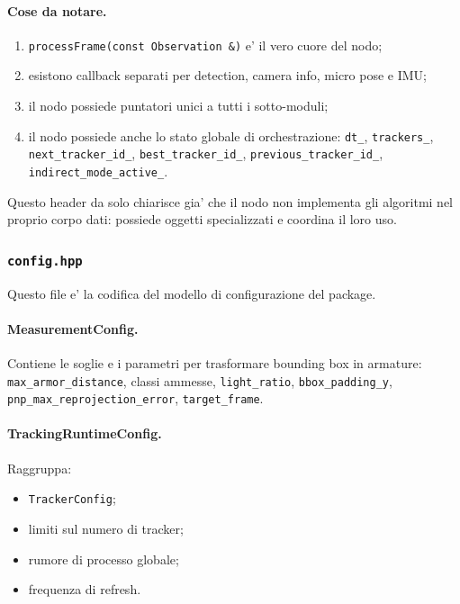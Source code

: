 \documentclass[11pt,a4paper]{article}
\newcommand{\code}[1]{\texttt{#1}}
\begin{document}
\paragraph{Cose da notare.}
\begin{enumerate}[leftmargin=1.4em]
  \item \code{processFrame(const Observation \&)} e' il vero cuore del nodo;
  \item esistono callback separati per detection, camera info, micro pose e IMU;
  \item il nodo possiede puntatori unici a tutti i sotto-moduli;
  \item il nodo possiede anche lo stato globale di orchestrazione: \code{dt\_}, \code{trackers\_}, \code{next\_tracker\_id\_}, \code{best\_tracker\_id\_}, \code{previous\_tracker\_id\_}, \code{indirect\_mode\_active\_}.
\end{enumerate}

Questo header da solo chiarisce gia' che il nodo non implementa gli algoritmi nel proprio corpo dati: possiede oggetti specializzati e coordina il loro uso.

\subsubsection{\code{config.hpp}}

Questo file e' la codifica del modello di configurazione del package.

\paragraph{MeasurementConfig.}
Contiene le soglie e i parametri per trasformare bounding box in armature:
\code{max\_armor\_distance}, classi ammesse, \code{light\_ratio}, \code{bbox\_padding\_y}, \code{pnp\_max\_reprojection\_error}, \code{target\_frame}.

\paragraph{TrackingRuntimeConfig.}
Raggruppa:
\begin{itemize}[leftmargin=1.4em]
  \item \code{TrackerConfig};
  \item limiti sul numero di tracker;
  \item rumore di processo globale;
  \item frequenza di refresh.
\end{itemize}
\end{document}
